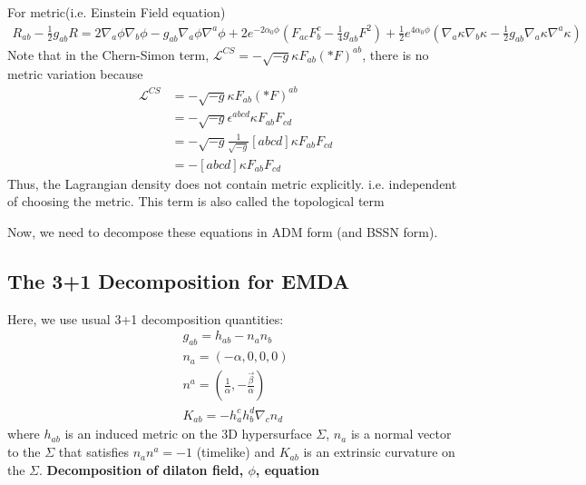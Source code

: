 \documentclass[prd]{revtex4}
\begin{document}
For metric(i.e. Einstein Field equation)
\begin{align}
R_{ab} -\frac{1}{2} g_{ab} R = 2 \nabla_a \phi \nabla_b \phi - g_{ab} \nabla_a \phi \nabla^a \phi + 2 e^{-2 \alpha_0 \phi} ( F_{ac} F_b^c -\frac{1}{4} g_{ab} F^2) + \frac{1}{2} e^{4 \alpha_0 \phi} (\nabla_a \kappa \nabla_b \kappa -\frac{1}{2} g_{ab} \nabla_a \kappa \nabla^a \kappa) 
\end{align}
Note that in the Chern-Simon term, $\mathcal{L}^{CS}= - \sqrt{-g} \kappa F_{ab} (\ast F)^{ab}$, there is no metric variation because 
\begin{align}
\mathcal{L}^{CS} &= - \sqrt{-g} \kappa F_{ab} (\ast F)^{ab} \nonumber \\
			   &=	- \sqrt{-g} \epsilon^{abcd}\kappa F_{ab} F_{cd} \nonumber \\
			   & =- \sqrt{-g} \frac{1}{\sqrt{-g}} \left[abcd\right] \kappa F_{ab} F_{cd} \nonumber \\
			   & =- \left[abcd\right] \kappa F_{ab} F_{cd} \nonumber
\end{align}
Thus, the Lagrangian density does not contain metric explicitly. i.e. independent of choosing the metric. This term is also called the topological term

Now, we need to decompose these equations in ADM form (and BSSN form).
\subsection{The 3+1 Decomposition for EMDA}
Here, we use usual 3+1 decomposition quantities:
\begin{align}
g_{ab}=h_{ab}-n_a n_b \nonumber \\
n_a = (-\alpha,0,0,0) \nonumber \\
n^a = \left(\frac{1}{\alpha}, -\frac{\vec{\beta}}{\alpha} \right) \nonumber \\
K_{ab} = - h_a^c h_b^d \nabla_c n_d \nonumber
\end{align}
where $h_{ab}$ is an induced metric on the 3D hypersurface $\Sigma$, $n_a$ is a normal vector to the $\Sigma$ that satisfies $n_a n^a =-1$ (timelike) and $K_{ab}$ is an extrinsic curvature on the $\Sigma$.
\newline
\newline
\textbf{Decomposition of dilaton field, $\phi$, equation}
\end{document}
